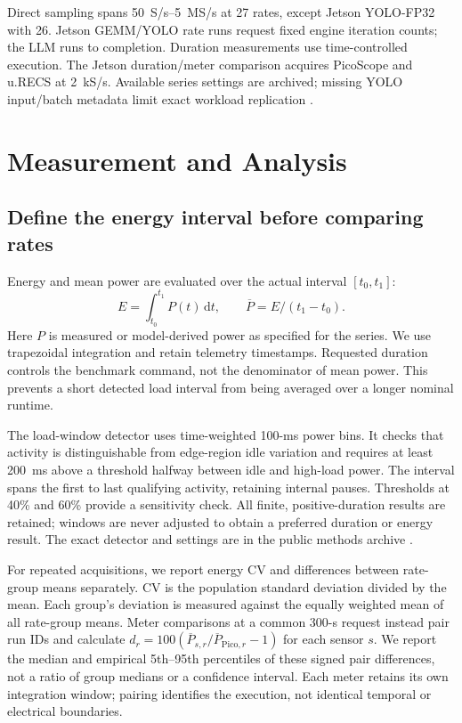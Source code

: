 \documentclass[a4paper,UKenglish,cleveref,autoref]{oasics-v2021}
\newcommand{\urecs}{u.RECS}
\begin{document}
Direct sampling spans 50~S/s--5~MS/s at 27 rates, except Jetson YOLO-FP32 with 26. Jetson GEMM/YOLO rate runs request fixed engine iteration counts; the LLM runs to completion. Duration measurements use time-controlled execution. The Jetson duration/meter comparison acquires PicoScope and \urecs{} at 2~kS/s. Available series settings are archived; missing YOLO input/batch metadata limit exact workload replication \cite{wachsmuth2026thesis,energyResults2026}.

\section{Measurement and Analysis}
\label{sec:method}
\subsection{Define the energy interval before comparing rates}
Energy and mean power are evaluated over the actual interval $[t_0,t_1]$:
\begin{equation}
 E=\int_{t_0}^{t_1}P(t)\,\mathrm{d}t,
 \qquad \overline P=E/(t_1-t_0).
 \label{eq:energy}
\end{equation}
Here $P$ is measured or model-derived power as specified for the series. We use trapezoidal integration and retain telemetry timestamps. Requested duration controls the benchmark command, not the denominator of mean power. This prevents a short detected load interval from being averaged over a longer nominal runtime.

The load-window detector uses time-weighted 100-ms power bins. It checks that activity is distinguishable from edge-region idle variation and requires at least 200~ms above a threshold halfway between idle and high-load power. The interval spans the first to last qualifying activity, retaining internal pauses. Thresholds at 40\% and 60\% provide a sensitivity check. All finite, positive-duration results are retained; windows are never adjusted to obtain a preferred duration or energy result. The exact detector and settings are in the public methods archive \cite{energyResults2026}.

For repeated acquisitions, we report energy CV and differences between rate-group means separately. CV is the population standard deviation divided by the mean. Each group's deviation is measured against the equally weighted mean of all rate-group means. Meter comparisons at a common 300-s request instead pair run IDs and calculate $d_r=100(\overline P_{s,r}/\overline P_{\mathrm{Pico},r}-1)$ for each sensor $s$. We report the median and empirical 5th--95th percentiles of these signed pair differences, not a ratio of group medians or a confidence interval. Each meter retains its own integration window; pairing identifies the execution, not identical temporal or electrical boundaries.
\end{document}
